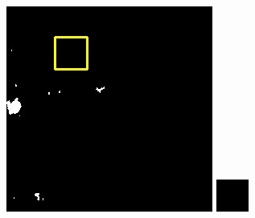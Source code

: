 \documentclass[UTF8]{ctexart}
\begin{document}
\begin{figure}[H]
{\begin{minipage}[b]{0.15\linewidth}
            \includegraphics[width=1\linewidth]{../log/spoon2/cut2/LC81620432014072LGN00_16329_mask.jpg}\vspace{4pt}
            \includegraphics[width=1\linewidth]{../log/spoon2/cut2/tmp_cut_LC81620432014072LGN00_16329_mask.jpg}\vspace{4pt}

\end{minipage}}
\end{figure}
\end{document}
